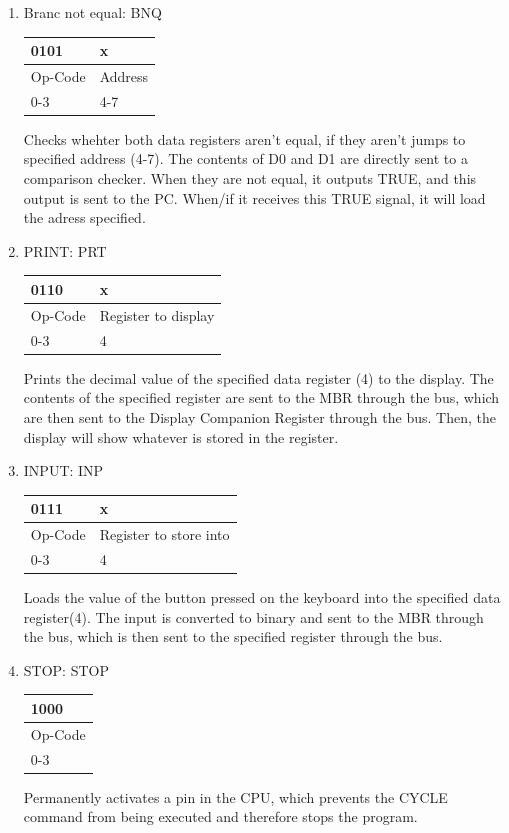 \documentclass{article}
\begin{document}
\begin{enumerate}
\item Branc not equal: BNQ\\
  \begin{tabularx}{\textwidth}{|X|X|}
    \hline 0101 & x
    \\ \hline Op-Code & Address
    \\ \hline 0-3 & 4-7
    \\ \hline
  \end{tabularx}
Checks whehter both data registers aren't equal, if they aren't jumps to specified address (4-7). The contents of D0 and D1 are directly sent to a comparison checker. When they are not equal, it outputs TRUE, and this output is sent to the PC. When/if it receives this TRUE signal, it will load the adress specified.

\item PRINT: PRT\\
  \begin{tabularx}{\textwidth}{|X|X|}
    \hline 0110 & x
    \\ \hline Op-Code & Register to display
    \\ \hline 0-3 & 4
    \\ \hline
  \end{tabularx}
Prints the decimal value of the specified data register (4) to the display. The contents of the specified register are sent to the MBR through the bus, which are then sent to the Display Companion Register through the bus. Then, the display will show whatever is stored in the register.

\item INPUT: INP\\
  \begin{tabularx}{\textwidth}{|X|X|}
    \hline 0111 & x
    \\ \hline Op-Code & Register to store into
    \\ \hline 0-3 & 4
    \\ \hline
  \end{tabularx}
Loads the value of the button pressed on the keyboard into the specified data register(4). The input is converted to binary and sent to the MBR through the bus, which is then sent to the specified register through the bus.

\item STOP: STOP\\
  \begin{tabularx}{\textwidth}{|X|}
    \hline 1000
    \\ \hline Op-Code
    \\ \hline 0-3
    \\ \hline
  \end{tabularx}
Permanently activates a pin in the CPU, which prevents the CYCLE command from being executed and therefore stops the program.


\end{enumerate}
\end{document}
